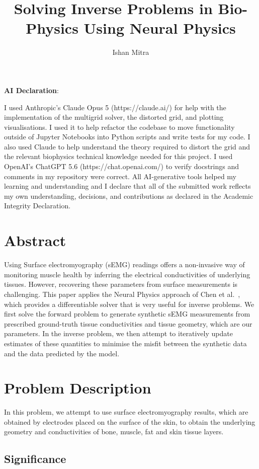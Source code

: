 \documentclass[final-report]{report-template}
\title{Solving Inverse Problems in Bio-Physics Using Neural Physics}
\author{Ishan Mitra}
\begin{document}
\maketitlepage  %

\textbf{AI Declaration}:

I used Anthropic’s Claude Opus 5 (https://claude.ai/) for help with the implementation of the multigrid solver, the distorted grid, and plotting visualisations. I used it to help refactor the codebase to move functionality outside of Jupyter Notebooks into Python scripts and write tests for my code. I also used Claude to help understand the theory required to distort the grid and the relevant biophysics technical knowledge needed for this project. I used OpenAI’s ChatGPT 5.6 (https://chat.openai.com/) to verify docstrings and comments in my repository were correct. All AI-generative tools helped my learning and understanding and I declare that all of the submitted work reflects my own understanding, decisions, and contributions as declared in the Academic Integrity Declaration.

\section{Abstract}

Using Surface electromyography (sEMG) readings offers a non-invasive way of monitoring muscle health by inferring the electrical conductivities of underlying tissues. However, recovering these parameters from surface measurements is challenging. This paper applies the Neural Physics approach of Chen et al.~\cite{chen2026}, which provides a differentiable solver that is very useful for inverse problems. We first solve the forward problem to generate synthetic sEMG measurements from prescribed ground-truth tissue conductivities and tissue geometry, which are our parameters. In the inverse problem, we then attempt to iteratively update estimates of these quantities to minimise the misfit between the synthetic data and the data predicted by the model.

\section{Problem Description}

In this problem, we attempt to use surface electromyography results, which are obtained by electrodes placed on the surface of the skin, to obtain the underlying geometry and conductivities of bone, muscle, fat and skin tissue layers.

\subsection{Significance}
\end{document}
